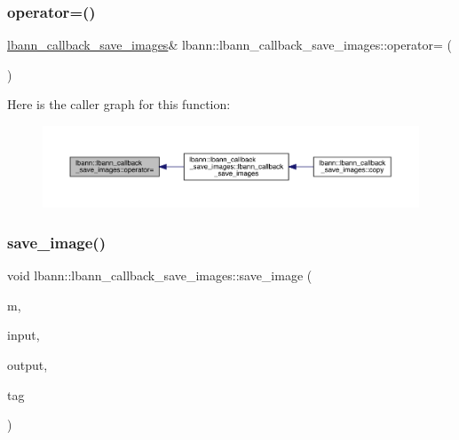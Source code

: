\subsubsection{\texorpdfstring{operator=()}{operator=()}}
{\footnotesize\ttfamily \hyperlink{classlbann_1_1lbann__callback__save__images}{lbann\+\_\+callback\+\_\+save\+\_\+images}\& lbann\+::lbann\+\_\+callback\+\_\+save\+\_\+images\+::operator= (\begin{DoxyParamCaption}\item[{const \hyperlink{classlbann_1_1lbann__callback__save__images}{lbann\+\_\+callback\+\_\+save\+\_\+images} \&}]{ }\end{DoxyParamCaption})\hspace{0.3cm}{\ttfamily [default]}}

Here is the caller graph for this function\+:\nopagebreak
\begin{figure}[H]
\begin{center}
\leavevmode
\includegraphics[width=350pt]{classlbann_1_1lbann__callback__save__images_a79fcd1489f0a5239303578d892c7a8b9_icgraph}
\end{center}
\end{figure}
\mbox{\label{classlbann_1_1lbann__callback__save__images_ab84c4d511a4614ca90644d12dc77edee}} 
\subsubsection{\texorpdfstring{save\+\_\+image()}{save\_image()}}
{\footnotesize\ttfamily void lbann\+::lbann\+\_\+callback\+\_\+save\+\_\+images\+::save\+\_\+image (\begin{DoxyParamCaption}\item[{\hyperlink{classlbann_1_1model}{model} \&}]{m,  }\item[{\hyperlink{base_8hpp_a9a697a504ae84010e7439ffec862b470}{Abs\+Dist\+Mat} \&}]{input,  }\item[{\hyperlink{base_8hpp_a9a697a504ae84010e7439ffec862b470}{Abs\+Dist\+Mat} \&}]{output,  }\item[{std\+::string}]{tag }\end{DoxyParamCaption})\hspace{0.3cm}{\ttfamily [private]}}




